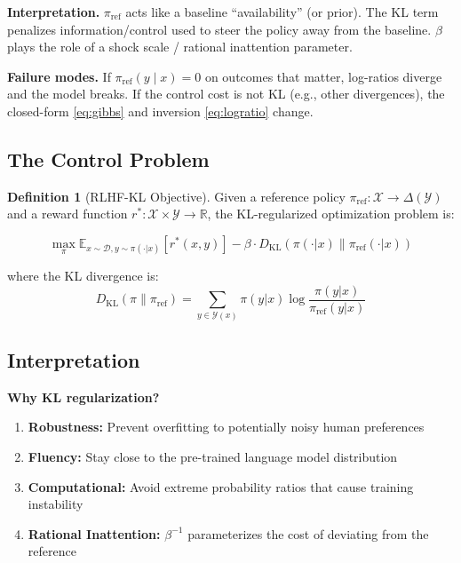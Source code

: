 \documentclass[11pt]{article}
\newcommand{\1}{\mathbf{1}}
\theoremstyle{plain}
\theoremstyle{definition}
\newtheorem{definition}{Definition}
\theoremstyle{remark}
\begin{document}
\begin{tcolorbox}[colback=white, colframe=accent, title=Model card B: KL-regularized (entropy) control around a reference policy]
\medskip
\textbf{Interpretation.} $\pi_{\mathrm{ref}}$ acts like a baseline ``availability'' (or prior). The KL term penalizes information/control
used to steer the policy away from the baseline. $\beta$ plays the role of a shock scale / rational inattention parameter.

\medskip
\textbf{Failure modes.} If $\pi_{\mathrm{ref}}(y\mid x)=0$ on outcomes that matter, log-ratios diverge and the model breaks.
If the control cost is not KL (e.g., other divergences), the closed-form \eqref{eq:gibbs} and inversion \eqref{eq:logratio} change.
\end{tcolorbox}

\subsection*{The Control Problem}

\begin{definition}[RLHF-KL Objective]
Given a reference policy $\pi_{\text{ref}}: \mathcal{X} \to \Delta(\mathcal{Y})$ and a reward function $r^*: \mathcal{X} \times \mathcal{Y} \to \mathbb{R}$, the KL-regularized optimization problem is:

$$
\max_{\pi} \mathbb{E}_{x \sim \mathcal{D}, y \sim \pi(\cdot|x)} [r^*(x,y)] - \beta \cdot D_{\text{KL}}(\pi(\cdot|x) \| \pi_{\text{ref}}(\cdot|x))
$$

where the KL divergence is:
$$
D_{\text{KL}}(\pi \| \pi_{\text{ref}}) = \sum_{y \in \mathcal{Y}(x)} \pi(y|x) \log \frac{\pi(y|x)}{\pi_{\text{ref}}(y|x)}
$$
\end{definition}

\subsection*{Interpretation}

\noindent \textbf{Why KL regularization?}

\begin{enumerate}
\item \textbf{Robustness:} Prevent overfitting to potentially noisy human preferences
\item \textbf{Fluency:} Stay close to the pre-trained language model distribution
\item \textbf{Computational:} Avoid extreme probability ratios that cause training instability
\item \textbf{Rational Inattention:} $\beta^{-1}$ parameterizes the cost of deviating from the reference
\end{enumerate}
\end{document}
